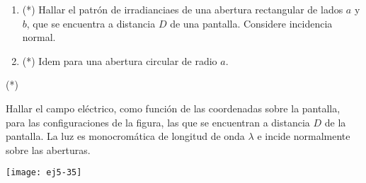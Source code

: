 \item
\begin{enumerate}
	\item (*) Hallar el patrón de irradianciaes de una abertura rectangular de lados $a$ y $b$, que se encuentra a distancia $D$ de una pantalla.
	Considere incidencia normal. 
	\item (*) Idem para una abertura circular de radio $a$.
\end{enumerate}



\item (*)
\begin{minipage}[t][1.2cm]{0.65\textwidth}
Hallar el campo eléctrico, como función de las coordenadas sobre la pantalla, para las configuraciones de la figura, las que se encuentran a distancia $D$ de la pantalla.
La luz es monocromática de longitud de onda $\lambda$ e incide normalmente sobre las aberturas. 
\end{minipage}
\begin{minipage}[c][1.5cm][t]{0.3\textwidth}
	\texttt{[image: ej5-35]}
\end{minipage}
